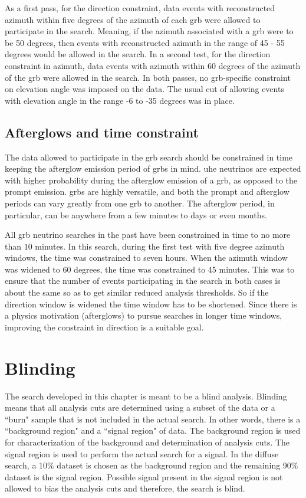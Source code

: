 As a first pass, for the direction constraint, 
data events with reconstructed azimuth within five degrees of the azimuth of each \gls{grb} were allowed to participate in the search. Meaning, if the azimuth associated with a \gls{grb} were to be 50 degrees, then events with reconstructed azimuth in the range of 45 - 55 degrees would be allowed in the search. In a second test, for the direction constraint in azimuth, data events with azimuth within 60 degrees of the azimuth of the \gls{grb} were allowed in the search. 
In both passes, no \gls{grb}-specific constraint on elevation angle was imposed on the data. The usual cut of allowing events with elevation angle in the range -6 to -35 degrees was in place. 

\subsection{Afterglows and time constraint}

The data allowed to participate in the \gls{grb} search should be constrained in time keeping the afterglow emission period of \gls{grbs} in mind. \gls{uhe} neutrinos are expected with higher probability during the afterglow emission of a \gls{grb}, as opposed to the prompt emission. \gls{grbs} are highly versatile, and both the prompt and afterglow periods can vary greatly from one \gls{grb} to another. The afterglow period, in particular, can be anywhere from a few minutes to days or even months. 

All \gls{grb} neutrino searches in the past have been constrained in time to no more than $10$ minutes. In this search, during the first test with five degree azimuth windows, the time was constrained to seven hours. When the azimuth window was widened to 60 degrees, the time was constrained to 45 minutes. This was to ensure that the number of events participating in the search in both cases is about the same so as to get similar reduced analysis thresholds. So if the direction window is widened the time window has to be shortened. Since there is a physics motivation (afterglows) to pursue searches in longer time windows, improving the constraint in direction is a suitable goal. 

\section{Blinding}

The search developed in this chapter is meant to be a blind analysis. 
Blinding means that all analysis cuts are determined using a subset of the data or a ``burn" sample that is not included in the actual search. In other words, there is a ``background region" and a ``signal region" of data. The background region is used for characterization of the background and determination of analysis cuts. The signal region is used to perform the actual search for a signal. In the diffuse search, a 10\% dataset is chosen as the background region and the remaining 90\% dataset is the signal region. Possible signal present in the signal region is not allowed to bias the analysis cuts and therefore, the search is blind. 

